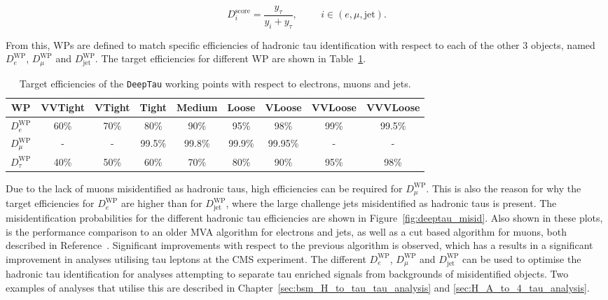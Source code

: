 \begin{equation}
D_{i}^{\text{score}} = \frac{y_\tau}{y_i + y_{\tau}}, \hspace{1cm} i \in (e,\mu,\text{jet}).
\end{equation}

From this, \ac{WP}s are defined to match specific efficiencies of hadronic tau identification with respect to each of the other 3 objects, named $D_{e}^{\text{WP}}$, $D_{\mu}^{\text{WP}}$ and $D_{\text{jet}}^{\text{WP}}$.
The target efficiencies for different \ac{WP} are shown in Table~\ref{tab:deeptau_eff}. \\

\begin{table}[!hbtp]
\begin{adjustwidth}{-1cm}{-1cm}
\centering
\begin{tabular}{|c|cccccccc|}
\hline
WP                     & VVTight & VTight & Tight  & Medium & Loose  & VLoose  & VVLoose & VVVLoose \\
\hline 
\hline
$D_{e}^{\text{WP}}$    & 60\%    & 70\%   & 80\%   & 90\%   & 95\%   & 98\%    & 99\%    & 99.5\%   \\
$D_{\mu}^{\text{WP}}$  & -       & -      & 99.5\% & 99.8\% & 99.9\% & 99.95\% & -       & -        \\
$D_{\tau}^{\text{WP}}$ & 40\%    & 50\%   & 60\%   & 70\%   & 80\%   & 90\%    & 95\%    & 98\%     \\
\hline
\end{tabular}
\caption{Target efficiencies of the \texttt{DeepTau} working points with respect to electrons, muons and jets.}
\label{tab:deeptau_eff}
\end{adjustwidth}
\end{table}

Due to the lack of muons misidentified as hadronic taus, high efficiencies can be required for $D_{\mu}^{\text{WP}}$.
This is also the reason for why the target efficiencies for $D_{e}^{\text{WP}}$ are higher than for $D_{\text{jet}}^{\text{WP}}$, where the large challenge jets misidentified as hadronic taus is present.
The misidentification probabilities for the different hadronic tau efficiencies are shown in Figure~\ref{fig:deeptau_misid}.
Also shown in these plots, is the performance comparison to an older \ac{MVA} algorithm for electrons and jets, as well as a cut based algorithm for muons, both described in Reference~\cite{CMS:2018jrd}.
Significant improvements with respect to the previous algorithm is observed, which has a results in a significant improvement in analyses utilising tau leptons at the CMS experiment.
The different $D_{e}^{\text{WP}}$, $D_{\mu}^{\text{WP}}$ and $D_{\text{jet}}^{\text{WP}}$ can be used to optimise the hadronic tau identification for analyses attempting to separate tau enriched signals from backgrounds of misidentified objects.
Two examples of analyses that utilise this are described in Chapter~\ref{sec:bsm_H_to_tau_tau_analysis} and \ref{sec:H_A_to_4_tau_analysis}.

